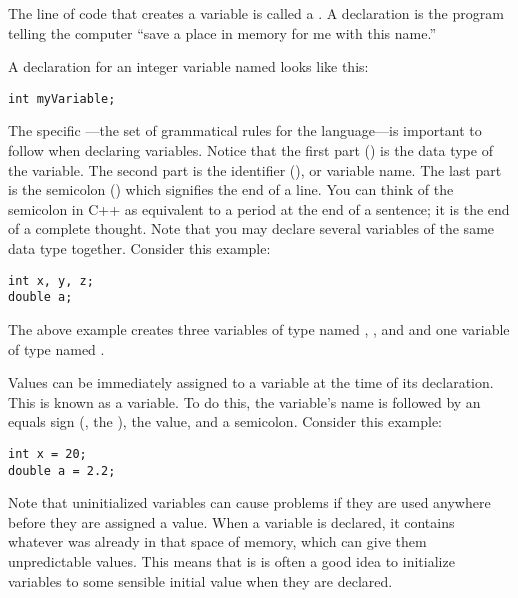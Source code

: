
The line of code that creates a variable is called a . 
A declaration is the program telling the computer ``save a place in memory for me with this name.'' 

A declaration for an integer variable named  looks like this:

\begin{lstlisting}
int myVariable;
\end{lstlisting}

The specific ---the set of grammatical rules for the language---is important to follow when declaring variables.
Notice that the first part () is the data type of the variable.
The second part is the identifier (), or variable name. 
The last part is the semicolon (\Code{;}) which signifies the end of a line. 
You can think of the semicolon in C++ as equivalent to a period at the end of a sentence; it is the end of a complete thought. 
Note that you may declare several variables of the same data type together.  Consider this example:

\begin{lstlisting}
int x, y, z;
double a;
\end{lstlisting}

The above example creates three variables of type  named , , and  and one variable of type  named .  



Values can be immediately assigned to a variable at the time of its declaration.  
This is known as  a variable.  
To do this, the variable's name is followed by an equals sign (\Code{=}, the ), the value, and a semicolon.  Consider this example:

\begin{lstlisting}
int x = 20;
double a = 2.2;
\end{lstlisting}
 
Note that uninitialized variables can cause problems if they are used anywhere before they are assigned a value. 
When a variable is declared, it contains whatever was already in that space of memory, which can give them unpredictable values. 
This means that is is often a good idea to initialize variables to some sensible initial value when they are declared.
  
